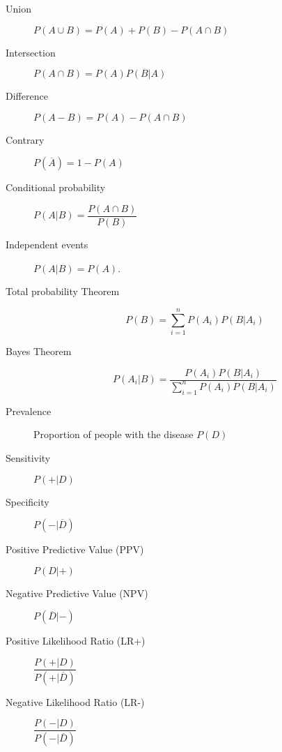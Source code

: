 \begin{multicols*}{2}
	\begin{tcolorbox}[hbox, title=Basic probability]
		\begin{minipage}{0.4\textwidth}
			\begin{description}
				\item [Union] $P(A\cup B)=P(A)+P(B)-P(A\cap B)$
				\item [Intersection] $P(A\cap B)=P(A)P(B|A)$
				\item [Difference] $P(A-B)=P(A)-P(A\cap B)$
				\item [Contrary] $P(\overline{A})=1-P(A)$
			\end{description}
		\end{minipage}
	\end{tcolorbox}

	\begin{tcolorbox}[hbox, title=Conditional probability]
		\begin{minipage}{0.4\textwidth}
			\begin{description}
				\item [Conditional probability] $P(A|B)=\dfrac{P(A\cap B)}{P(B)}$
				\item [Independent events] $P(A|B)=P(A)$.
				\item [Total probability Theorem] \[P(B)=\sum_{i=1}^n P(A_i)P(B|A_i)\]
				\item [Bayes Theorem] \[P(A_i|B)=\dfrac{P(A_i)P(B|A_i)}{\sum_{i=1}^n P(A_i)P(B|A_i)}\]
			\end{description}
		\end{minipage}
	\end{tcolorbox}

	\begin{tcolorbox}[hbox, title=Diagnostic tests]
		\begin{minipage}{0.4\textwidth}
			\begin{description}
				\item[Prevalence] Proportion of people with the disease $P(D)$
				\item[Sensitivity] $P(+|D)$
				\item[Specificity] $P(-|\overline{D})$
				\item[Positive Predictive Value (PPV)] $P(D|+)$
				\item[Negative Predictive Value (NPV)] $P(\overline{D}|-)$
				\item[Positive Likelihood Ratio (LR+)] $\dfrac{P(+|D)}{P(+|\overline{D})}$
				\item[Negative Likelihood Ratio (LR-)] $\dfrac{P(-|D)}{P(-|\overline{D})}$
			\end{description}
		\end{minipage}
	\end{tcolorbox}



\end{multicols*}
